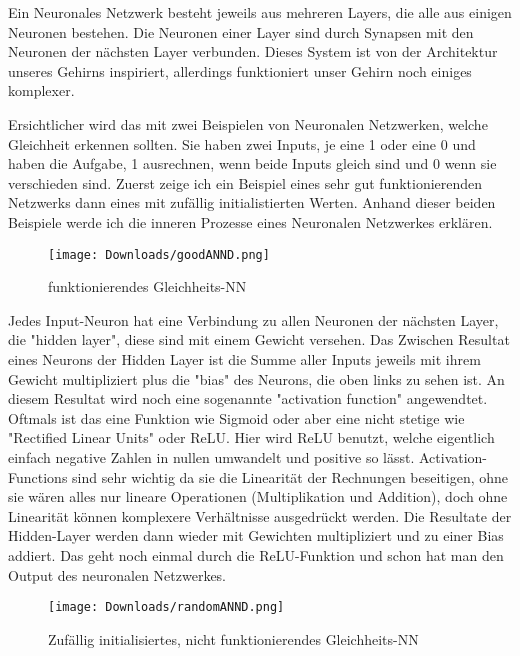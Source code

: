 \documentclass[11pt,a4paper,ngerman]{article}
\begin{document}
\bigskip
Ein Neuronales Netzwerk besteht jeweils aus mehreren Layers, die alle aus einigen Neuronen bestehen. Die Neuronen einer Layer sind durch Synapsen mit den Neuronen der nächsten Layer verbunden. Dieses System ist von der Architektur unseres Gehirns inspiriert, allerdings funktioniert unser Gehirn noch einiges komplexer.

\bigskip
Ersichtlicher wird das mit zwei Beispielen von Neuronalen Netzwerken, welche Gleichheit erkennen sollten. Sie haben zwei Inputs, je eine 1 oder eine 0 und haben die Aufgabe, 1 ausrechnen, wenn beide Inputs gleich sind und 0 wenn sie verschieden sind. Zuerst zeige ich ein Beispiel eines sehr gut funktionierenden Netzwerks dann eines mit zufällig initialistierten Werten. Anhand dieser beiden Beispiele werde ich die inneren Prozesse eines Neuronalen Netzwerkes erklären. 

\begin{figure}[h]
    \begin{center}
        \texttt{[image: Downloads/goodANND.png]}
        \caption{funktionierendes Gleichheits-NN}
    \end{center}
\end{figure}

Jedes Input-Neuron hat eine Verbindung zu allen Neuronen der nächsten Layer, die "hidden layer", diese sind mit einem Gewicht versehen. Das Zwischen Resultat eines Neurons der Hidden Layer ist die Summe aller Inputs jeweils mit ihrem Gewicht multipliziert plus die "bias" des Neurons, die oben links zu sehen ist. An diesem Resultat wird noch eine sogenannte "activation function" angewendtet. Oftmals ist das eine Funktion wie Sigmoid oder aber eine nicht stetige wie "Rectified Linear Units" oder ReLU. Hier wird ReLU benutzt, welche eigentlich einfach negative Zahlen in nullen umwandelt und positive so lässt. Activation-Functions sind sehr wichtig da sie die Linearität der Rechnungen beseitigen, ohne sie wären alles nur lineare Operationen (Multiplikation und Addition), doch ohne Linearität können komplexere Verhältnisse ausgedrückt werden. Die Resultate der Hidden-Layer werden dann wieder mit Gewichten multipliziert und zu einer Bias addiert. Das geht noch einmal durch die ReLU-Funktion und schon hat man den Output des neuronalen Netzwerkes.

\begin{figure}[h]
    \begin{center}
        \texttt{[image: Downloads/randomANND.png]}
    \caption{Zufällig initialisiertes, nicht funktionierendes Gleichheits-NN}
    \end{center}    
\end{figure}
\end{document}
